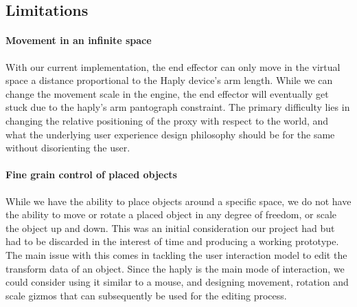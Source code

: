 \subsection{Limitations}

\paragraph{Movement in an infinite space}

With our current implementation, the end effector can only move in the virtual space a distance proportional to the Haply device's arm length. While we can change the movement scale in the engine, the end effector will eventually get stuck due to the haply's arm pantograph constraint. The primary difficulty lies in changing the relative positioning of the proxy with respect to the world, and what the underlying user experience design philosophy should be for the same without disorienting the user.

\paragraph{Fine grain control of placed objects}
While we have the ability to place objects around a specific space, we do not have the ability to move or rotate a placed object in any degree of freedom, or scale the object up and down. This was an initial consideration our project had but had to be discarded in the interest of time and producing a working prototype. The main issue with this comes in tackling the user interaction model to edit the transform data of an object. Since the haply is the main mode of interaction, we could consider using it similar to a mouse, and designing movement, rotation and scale gizmos that can subsequently be used for the editing process.
